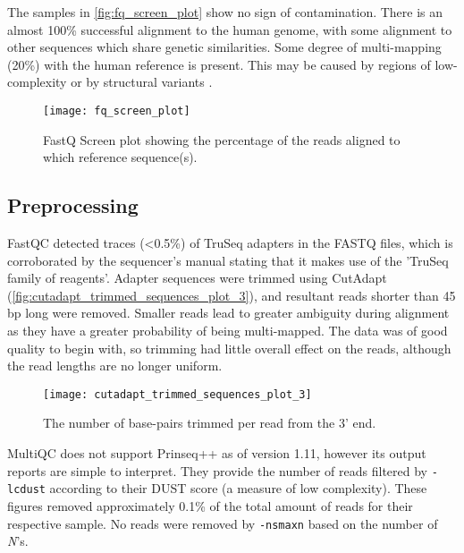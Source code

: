 The samples in \autoref{fig:fq_screen_plot} show no sign of contamination. There is an almost 100\% successful alignment to the human genome, with some alignment to other sequences which share genetic similarities. Some degree of multi-mapping (20\%) with the human reference is present. This may be caused by regions of low-complexity or by structural variants \citep{rhoads2015pacbio}.

\begin{figure}[!h]
    \centering
    \texttt{[image: fq\_screen\_plot]}
    \caption{FastQ Screen plot showing the percentage of the reads aligned to which reference sequence(s).} 
    \label{fig:fq_screen_plot}
\end{figure}


\subsection{Preprocessing}
FastQC detected traces (<0.5\%) of TruSeq adapters in the FASTQ files, which is corroborated by the sequencer's manual \citep{HiSeq2000} stating that it makes use of the 'TruSeq family of reagents'. Adapter sequences were trimmed using CutAdapt (\autoref{fig:cutadapt_trimmed_sequences_plot_3}), and resultant reads shorter than 45 bp long were removed. Smaller reads lead to greater ambiguity during alignment as they have a greater probability of being multi-mapped.  The data was of good quality to begin with, so trimming had little overall effect on the reads, although the read lengths are no longer uniform.


\begin{figure}[!h]
    \centering
    \texttt{[image: cutadapt\_trimmed\_sequences\_plot\_3]}
    \caption{The number of base-pairs trimmed per read from the 3' end.} 
    \label{fig:cutadapt_trimmed_sequences_plot_3}
\end{figure}
\newpage

MultiQC does not support Prinseq++ as of version 1.11, however its output reports are simple to interpret. They provide the number of reads filtered by \texttt{-lc\textunderscore dust} according to their DUST score (a measure of low complexity). These figures removed approximately 0.1\% of the total amount of reads for their respective sample. No reads were removed by \texttt{-ns\textunderscore max\textunderscore n} based on the number of \textit{N}'s.



